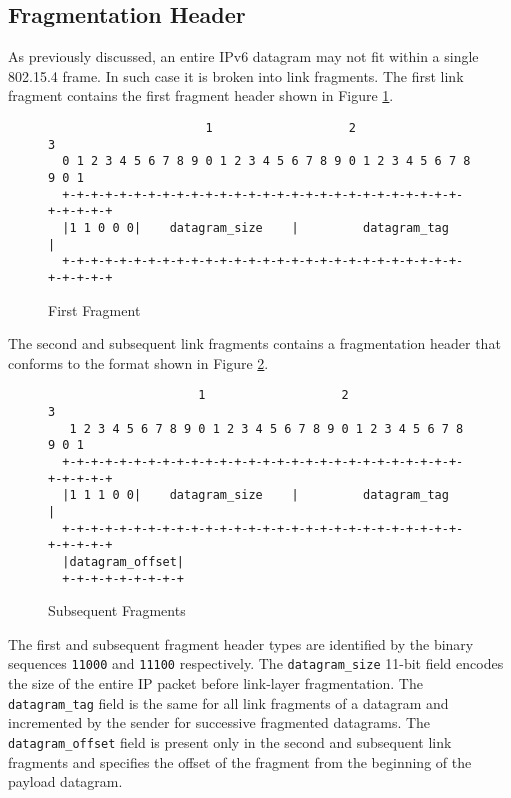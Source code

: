 \documentclass[12pt, titlepage, a4paper]{report}
\newenvironment{mylisting}
{\begin{list}{}{\setlength{\leftmargin}{1em}}\item\footnotesize}
{\end{list}}
\begin{document}
\subsection{Fragmentation Header}\label{subsec:frag.header}
As previously discussed, an entire IPv6 datagram may not fit within a single 802.15.4 frame. In such case it is broken into link fragments. The first link fragment contains the first fragment header shown in Figure \ref{fig:first.fragment}.
\begin{figure}[htp]
\centering
\begin{mylisting}
\begin{verbatim}
                      1                   2                   3
  0 1 2 3 4 5 6 7 8 9 0 1 2 3 4 5 6 7 8 9 0 1 2 3 4 5 6 7 8 9 0 1
  +-+-+-+-+-+-+-+-+-+-+-+-+-+-+-+-+-+-+-+-+-+-+-+-+-+-+-+-+-+-+-+-+
  |1 1 0 0 0|    datagram_size    |         datagram_tag          |
  +-+-+-+-+-+-+-+-+-+-+-+-+-+-+-+-+-+-+-+-+-+-+-+-+-+-+-+-+-+-+-+-+
\end{verbatim}
\end{mylisting}
\caption{First Fragment}\label{fig:first.fragment}
\end{figure}

The second and subsequent link fragments contains a fragmentation header that conforms to the format shown in Figure \ref{fig:sub.fragment}.

\begin{figure}[htp]
\centering
\begin{mylisting}
\begin{verbatim}
                     1                   2                   3
   1 2 3 4 5 6 7 8 9 0 1 2 3 4 5 6 7 8 9 0 1 2 3 4 5 6 7 8 9 0 1
  +-+-+-+-+-+-+-+-+-+-+-+-+-+-+-+-+-+-+-+-+-+-+-+-+-+-+-+-+-+-+-+-+
  |1 1 1 0 0|    datagram_size    |         datagram_tag          |
  +-+-+-+-+-+-+-+-+-+-+-+-+-+-+-+-+-+-+-+-+-+-+-+-+-+-+-+-+-+-+-+-+
  |datagram_offset|
  +-+-+-+-+-+-+-+-+
\end{verbatim}
\end{mylisting}
\caption{Subsequent Fragments}\label{fig:sub.fragment}
\end{figure}

The first and subsequent fragment header types are identified by the binary sequences \texttt{11000} and \texttt{11100} respectively.  The  \texttt{datagram\_size} 11-bit field encodes the size of the entire IP packet before link-layer fragmentation.  The \texttt{datagram\_tag} field is the same for all link fragments of a datagram and incremented by the sender for successive fragmented datagrams. The \texttt{datagram\_offset} field is present only in the second and subsequent link fragments and specifies the offset of the fragment from the beginning of the payload datagram.
\end{document}
